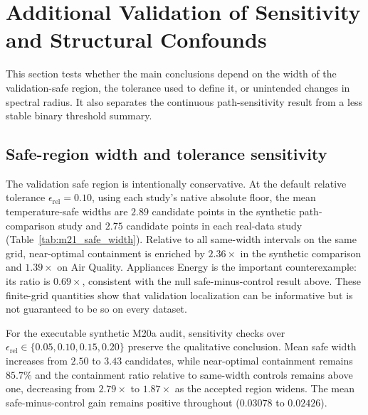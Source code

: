 \documentclass[11pt,a4paper]{article}
\begin{document}
\section{Additional Validation of Sensitivity and Structural Confounds}
\label{sec:additional_validation}

This section tests whether the main conclusions depend on the width of the validation-safe region, the tolerance used to define it, or unintended changes in spectral radius. It also separates the continuous path-sensitivity result from a less stable binary threshold summary.

\subsection{Safe-region width and tolerance sensitivity}

The validation safe region is intentionally conservative. At the default relative tolerance $\epsilon_{\mathrm{rel}}=0.10$, using each study's native absolute floor, the mean temperature-safe widths are $2.89$ candidate points in the synthetic path-comparison study and $2.75$ candidate points in each real-data study (Table~\ref{tab:m21_safe_width}). Relative to all same-width intervals on the same grid, near-optimal containment is enriched by $2.36\times$ in the synthetic comparison and $1.39\times$ on Air Quality. Appliances Energy is the important counterexample: its ratio is $0.69\times$, consistent with the null safe-minus-control result above. These finite-grid quantities show that validation localization can be informative but is not guaranteed to be so on every dataset.

For the executable synthetic M20a audit, sensitivity checks over $\epsilon_{\mathrm{rel}}\in\{0.05,0.10,0.15,0.20\}$ preserve the qualitative conclusion. Mean safe width increases from $2.50$ to $3.43$ candidates, while near-optimal containment remains $85.7\%$ and the containment ratio relative to same-width controls remains above one, decreasing from $2.79\times$ to $1.87\times$ as the accepted region widens. The mean safe-minus-control gain remains positive throughout ($0.03078$ to $0.02426$).
\end{document}
